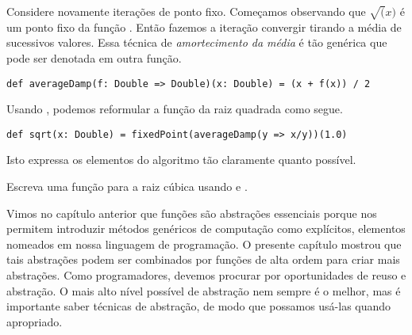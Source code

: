 Considere novamente itera\c{c}\~{o}es de ponto fixo. Come\c{c}amos observando que 
$\sqrt(x)$ \'{e} um ponto fixo da fun\c{c}\~{a}o . Ent\~{a}o fazemos
a itera\c{c}\~{a}o convergir tirando a m\'{e}dia de sucessivos valores. Essa t\'{e}cnica
de {\em amortecimento da m\'{e}dia} \'{e} t\~{a}o gen\'{e}rica que pode ser denotada
em outra fun\c{c}\~{a}o.
\begin{lstlisting}
def averageDamp(f: Double => Double)(x: Double) = (x + f(x)) / 2
\end{lstlisting}
Usando , podemos reformular a fun\c{c}\~{a}o da raiz quadrada
como segue. 
\begin{lstlisting}
def sqrt(x: Double) = fixedPoint(averageDamp(y => x/y))(1.0)
\end{lstlisting}
Isto expressa os elementos do algoritmo t\~{a}o claramente quanto poss\'{i}vel.
\begin{exercise} 
Escreva uma fun\c{c}\~{a}o para a raiz c\'{u}bica usando  e .  
\end{exercise}


Vimos no cap\'{i}tulo anterior que fun\c{c}\~{o}es s\~{a}o abstra\c{c}\~{o}es essenciais porque 
nos permitem introduzir m\'{e}todos gen\'{e}ricos de computa\c{c}\~{a}o como expl\'{i}citos,
elementos nomeados em nossa linguagem de programa\c{c}\~{a}o. O presente cap\'{i}tulo
mostrou que tais abstra\c{c}\~{o}es podem ser combinados por fun\c{c}\~{o}es de alta ordem
para criar mais abstra\c{c}\~{o}es. Como programadores, devemos procurar por oportunidades 
de reuso e abstra\c{c}\~{a}o. O mais alto n\'{i}vel poss\'{i}vel de abstra\c{c}\~{a}o nem sempre \'{e} 
o melhor, mas \'{e} importante saber t\'{e}cnicas de abstra\c{c}\~{a}o, de modo que possamos
us\'{a}-las quando apropriado. 

